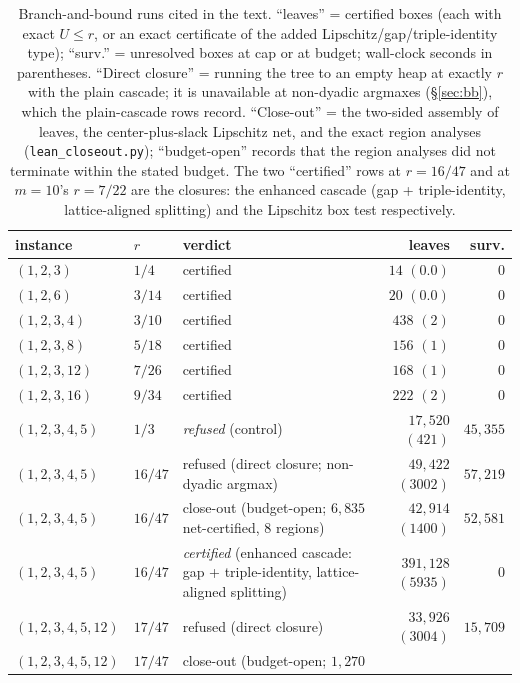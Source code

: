 \documentclass[11pt,a4paper]{article}
\numberwithin{equation}{section}
\theoremstyle{plain}
\theoremstyle{definition}
\theoremstyle{remark}
\begin{document}
\begin{table}[htbp]
\centering
\small
\caption{Branch-and-bound runs cited in the text. ``leaves'' = certified
boxes (each with exact $U\le r$, or an exact certificate of the added
Lipschitz/gap/triple-identity type); ``surv.'' = unresolved boxes at cap
or at budget; wall-clock seconds in parentheses. ``Direct closure'' =
running the tree to an empty heap at exactly $r$ with the plain
cascade; it is unavailable at non-dyadic argmaxes (\S\ref{sec:bb}),
which the plain-cascade rows record. ``Close-out'' = the two-sided
assembly of leaves, the center-plus-slack Lipschitz net, and the exact
region analyses (\texttt{lean\_closeout.py}); ``budget-open'' records
that the region analyses did not terminate within the stated budget.
The two ``certified'' rows at $r=16/47$ and at $m=10$'s $r=7/22$ are
the closures: the enhanced cascade (gap + triple-identity,
lattice-aligned splitting) and the Lipschitz box test respectively.}
\label{tab:certs}
\begin{tabularx}{\textwidth}{@{} l l >{\raggedright\arraybackslash}X r r @{}}
\toprule
instance & $r$ & verdict & leaves & surv. \\
\midrule
$(1,2,3)$ & $1/4$ & certified & $14$ $(0.0)$ & $0$ \\
$(1,2,6)$ & $3/14$ & certified & $20$ $(0.0)$ & $0$ \\
$(1,2,3,4)$ & $3/10$ & certified & $438$ $(2)$ & $0$ \\
$(1,2,3,8)$ & $5/18$ & certified & $156$ $(1)$ & $0$ \\
$(1,2,3,12)$ & $7/26$ & certified & $168$ $(1)$ & $0$ \\
$(1,2,3,16)$ & $9/34$ & certified & $222$ $(2)$ & $0$ \\
$(1,2,3,4,5)$ & $1/3$ & \emph{refused} (control) & $17{,}520$ $(421)$
& $45{,}355$ \\
$(1,2,3,4,5)$ & $16/47$ & refused (direct closure; non-dyadic argmax)
& $49{,}422$ $(3002)$ & $57{,}219$ \\
$(1,2,3,4,5)$ & $16/47$ & close-out (budget-open; $6{,}835$
net-certified, $8$ regions) & $42{,}914$ $(1400)$ & $52{,}581$ \\
$(1,2,3,4,5)$ & $16/47$ & \emph{certified} (enhanced cascade: gap +
triple-identity, lattice-aligned splitting) & $391{,}128$ $(5935)$ &
$0$ \\
$(1,2,3,4,5,12)$ & $17/47$ & refused (direct closure) & $33{,}926$
$(3004)$ & $15{,}709$ \\
$(1,2,3,4,5,12)$ & $17/47$ & close-out (budget-open; $1{,}270$

\end{tabularx}
\end{table}
\end{document}
